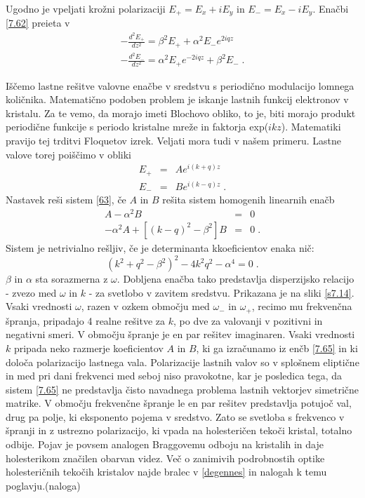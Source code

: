 Ugodno je vpeljati krožni polarizaciji $E_{+}=E_{x}+iE_{y}$ in $E_{-}=E_{x}-iE_{y}$.
Enačbi \ref{7.62} preieta v 
\begin{eqnarray}
-\frac{d^{2}E_{+}}{dz^{2}}=\beta^{2}E_{+}+\alpha^{2}E_{-}e^{2iqz}\nonumber \\
-\frac{d^{2}E_{-}}{dz^{2}}=\alpha^{2}E_{+}e^{-2iqz}+\beta^{2}E_{-}\;.
\end{eqnarray}


Iščemo lastne rešitve valovne enačbe v sredstvu s periodično modulacijo
lomnega količnika. Matematično podoben problem je iskanje lastnih
funkcij elektronov v kristalu. Za te vemo, da morajo imeti Blochovo
obliko, to je, biti morajo produkt periodične funkcije s periodo kristalne
mreže in faktorja exp($ikz$). Matematiki pravijo tej trditvi Floquetov
izrek. Veljati mora tudi v našem primeru. Lastne valove torej poiščimo
v obliki 
\begin{eqnarray}
E_{+} & = & Ae^{i(k+q)z}\nonumber \\
E_{-} & = & Be^{i(k-q)z}\;.
\end{eqnarray}
 Nastavek reši sistem \ref{63}, če $A$ in $B$ rešita sistem homogenih
linearnih enačb 
\begin{eqnarray}
[(k+q)^{2}-\beta^{2}]A-\alpha^{2}B & = & 0\nonumber \\
-\alpha^{2}A+[(k-q)^{2}-\beta^{2}]B & = & 0\;.
\end{eqnarray}
 Sistem je netrivialno rešljiv, če je determinanta kkoeficientov enaka
nič: 
\begin{equation}
(k^{2}+q^{2}-\beta^{2})^{2}-4k^{2}q^{2}-\alpha^{4}=0\;.\label{7.66}
\end{equation}
 $\beta$ in $\alpha$ sta sorazmerna z $\omega$. Dobljena enačba
tako predstavlja disperzijsko relacijo - zvezo med $\omega$ in $k$
- za svetlobo v zavitem sredstvu. Prikazana je na sliki \ref{s7.14}.
Vsaki vrednosti $\omega$, razen v ozkem območju med $\omega_{-}$
in $\omega_{+}$, recimo mu frekvenčna špranja, pripadajo 4 realne
rešitve za $k$, po dve za valovanji v pozitivni in negativni smeri.
V območju špranje je en par rešitev imaginaren. Vsaki vrednosti $k$
pripada neko razmerje koeficientov $A$ in $B$, ki ga izračunamo
iz enčb \ref{7.65} in ki določa polarizacijo lastnega vala. Polarizacije
lastnih valov so v splošnem eliptične in med pri dani frekvenci med
seboj niso pravokotne, kar je posledica tega, da sistem \ref{7.65}
ne predstavlja čisto navadnega problema lastnih vektorjev simetrične
matrike. V območju frekvenčne špranje le en par rešitev predstavlja
potujoč val, drug pa polje, ki eksponento pojema v sredstvo. Zato
se svetloba s frekvenco v špranji in z ustrezno polarizacijo, ki vpada
na holesteričen tekoči kristal, totalno odbije. Pojav je povsem analogen
Braggovemu odboju na kristalih in daje holesterikom značilen obarvan
videz. Več o zanimivih podrobnostih optike holesteričnih tekočih kristalov
najde bralec v \ref{degennes} in nalogah k temu poglavju.(naloga)

